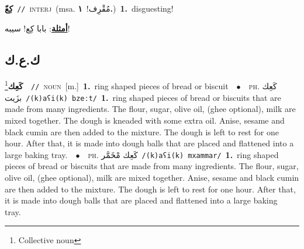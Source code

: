 \documentclass[10pt,a4paper,twoside]{article} %
\begin{document}
\begin{multicols}{2}
{\setlength\topsep{0pt}\textbf{\foreignlanguage{arabic}{كِعّ}}\ {\color{gray}\texttt{//}\color{black}}\ \textsc{interj}\ \color{gray}(msa. \foreignlanguage{arabic}{مُقْرِف!}~\foreignlanguage{arabic}{\textbf{١.}})\color{black}\ \textbf{1.}~disguesting!\  \begin{flushright}\color{gray}\foreignlanguage{arabic}{\textbf{\underline{\foreignlanguage{arabic}{أمثلة}}}: بابا كِع! سيبه!}\end{flushright}\color{black}} \vspace{2mm}

\vspace{-3mm}
\subsection*{\color{blue}\foreignlanguage{arabic}{ك.ع.ك}\color{blue}{}} 

{\setlength\topsep{0pt}\textbf{\foreignlanguage{arabic}{كَعِك}}\footnote{Collective noun}\ \ {\color{gray}\texttt{//}\color{black}}\ \textsc{noun}\ [m.]\ \textbf{1.}~ring shaped pieces of bread or biscuit\ \ $\bullet$\ \ \textsc{ph.} \color{gray} \foreignlanguage{arabic}{كَعِك بزَيت}\color{black}\ {\color{gray}\texttt{/{\sffamily (k)aʕi(k) bzeːt}/}\color{black}}\ \textbf{1.}~ring shaped pieces of bread or biscuits that are made from many ingredients. The flour, sugar, olive oil, (ghee optional), milk are mixed together. The dough is kneaded with some extra oil. Anise, sesame and black cumin are then added to the mixture. The dough is left to rest for one hour. After that, it is made into dough balls that are placed and flattened into a large baking tray.\ \ $\bullet$\ \ \textsc{ph.} \color{gray} \foreignlanguage{arabic}{كَعِك مْخَمَّر}\color{black}\ {\color{gray}\texttt{/{\sffamily (k)aʕi(k) mxammar}/}\color{black}}\ \textbf{1.}~ring shaped pieces of bread or biscuits that are made from many ingredients. The flour, sugar, olive oil, (ghee optional), milk are mixed together. Anise, sesame and black cumin are then added to the mixture. The dough is left to rest for one hour. After that, it is made into dough balls that are placed and flattened into a large baking tray.\ } \vspace{2mm}


\end{multicols}
\end{document}
